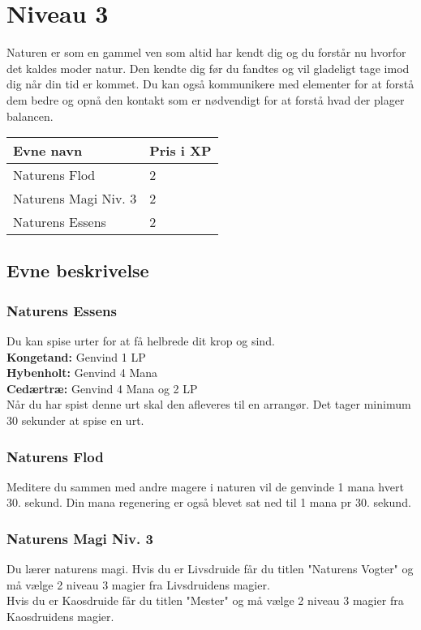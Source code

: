 \chapter{Niveau 3}

Naturen er som en gammel ven som altid har kendt dig og du forstår nu hvorfor det kaldes moder natur. Den kendte dig før du fandtes og vil gladeligt tage imod dig når din tid er kommet.
Du kan også kommunikere med elementer for at forstå dem bedre og opnå den kontakt som er nødvendigt for at forstå hvad der plager balancen.


\begin{table}[H]
    \centering
    \begin{tabular}{|p{}|p{}|}
    \rowcolor{cerulean!80}\hline
        Evne navn & Pris i XP \\\hline
        Naturens Flod & 2 \\\hline
        Naturens Magi Niv. 3 & 2\\\hline
        Naturens Essens & 2 \\\hline
    \end{tabular}
\end{table}
\section{Evne beskrivelse}



\subsection{Naturens Essens}
Du kan spise urter for at få helbrede dit krop og sind.\\
\textbf{Kongetand:} Genvind 1 LP\\
\textbf{Hybenholt:} Genvind 4 Mana\\
\textbf{Cedærtræ:} Genvind 4 Mana og 2 LP\\
Når du har spist denne urt skal den afleveres til en arrangør. Det tager minimum 30 sekunder at spise en urt.

\subsection{Naturens Flod}
Meditere du sammen med andre magere i naturen vil de genvinde 1 mana hvert 30. sekund. Din mana regenering er også blevet sat ned til 1 mana pr 30. sekund.

\subsection{Naturens Magi Niv. 3}
Du lærer naturens magi. Hvis du er Livsdruide får du titlen "Naturens Vogter" og må vælge 2 niveau 3 magier fra Livsdruidens magier.\\ Hvis du er Kaosdruide får du titlen "Mester" og må vælge 2 niveau 3 magier fra Kaosdruidens magier.\\
